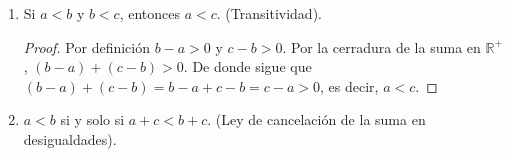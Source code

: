 \documentclass[11pt]{article}
\newcommand{\R}{\mathbb{R}}
\begin{document}
\begin{enumerate}[label=\alph*)]
    \item Si $a<b$ y $b<c$, entonces $a<c$. (Transitividad).
    \vspace{-1em}\begin{proof} 
        Por definición $b-a >0$ y $c-b >0$. Por la cerradura de la suma en $\R^+$, $(b-a) + (c-b) >0$. De donde sigue que $(b-a)+(c-b)=b-a+c-b=c-a>0$, es decir, $a<c$.
    \end{proof} \vspace{-1em}

    \item $a<b$ si y solo si $a+c<b+c$. (Ley de cancelación de la suma en desigualdades).
    

\end{enumerate}
\end{document}
